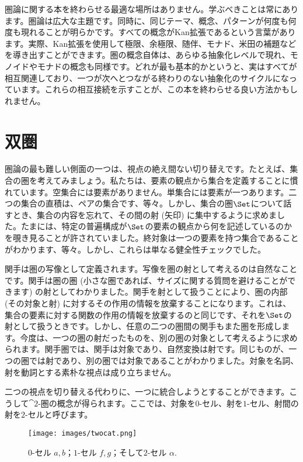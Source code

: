 
\lettrine[lhang=0.17]{圏}{論}に関する本を終わらせる最適な場所はありません。学ぶべきことは常にあります。圏論は広大な主題です。同時に、同じテーマ、概念、パターンが何度も何度も現れることが明らかです。すべての概念がKan拡張であるという言葉があります。実際、Kan拡張を使用して極限、余極限、随伴、モナド、米田の補題などを導き出すことができます。圏の概念自体は、あらゆる抽象化レベルで現れ、モノイドやモナドの概念も同様です。どれが最も基本的かというと、実はすべてが相互関連しており、一つが次へとつながる終わりのない抽象化のサイクルになっています。これらの相互接続を示すことが、この本を終わらせる良い方法かもしれません。

\section{双圏}

圏論の最も難しい側面の一つは、視点の絶え間ない切り替えです。たとえば、集合の圏を考えてみましょう。私たちは、要素の観点から集合を定義することに慣れています。空集合には要素がありません。単集合には要素が一つあります。二つの集合の直積は、ペアの集合です、等々。しかし、集合の圏$\Set$について話すとき、集合の内容を忘れて、その間の射 (矢印) に集中するように求めました。たまには、特定の普遍構成が$\Set$の要素の観点から何を記述しているのかを覗き見ることが許されていました。終対象は一つの要素を持つ集合であることがわかります、等々。しかし、これらは単なる健全性チェックでした。

関手は圏の写像として定義されます。写像を圏の射として考えるのは自然なことです。関手は圏の圏 (小さな圏であれば、サイズに関する質問を避けることができます) の射としてわかりました。関手を射として扱うことにより、圏の内部 (その対象と射) に対するその作用の情報を放棄することになります。これは、集合の要素に対する関数の作用の情報を放棄するのと同じです、それを$\Set$の射として扱うときです。しかし、任意の二つの圏間の関手もまた圏を形成します。今度は、一つの圏の射だったものを、別の圏の対象として考えるように求められます。関手圏では、関手は対象であり、自然変換は射です。同じものが、一つの圏では射であり、別の圏では対象であることがわかりました。対象を名詞、射を動詞とする素朴な視点は成り立ちません。

二つの視点を切り替える代わりに、一つに統合しようとすることができます。こうして$\cat{2}$-圏の概念が得られます。ここでは、対象を$0$-セル、射を$1$-セル、射間の射を$2$-セルと呼びます。

\begin{figure}[H]
  \centering
  \texttt{[image: images/twocat.png]}
  \caption{$0$-セル $a, b$；$1$-セル $f, g$；そして$2$-セル $\alpha$.}
\end{figure}

